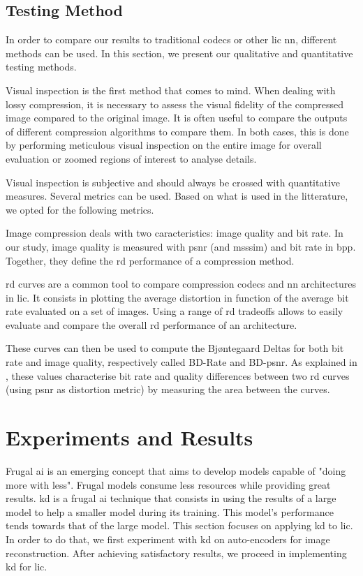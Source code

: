 \documentclass{article}
\begin{document}
\subsection{Testing Method}
In order to compare our results to traditional codecs or other \acrshort{lic} \acrshort{nn}, different methods can be used. In this section, we present our qualitative and quantitative testing methods.

Visual inspection is the first method that comes to mind. When dealing with lossy compression, it is necessary to assess the visual fidelity of the compressed image compared to the original image. It is often useful to compare the outputs of different compression algorithms to compare them. In both cases, this is done by performing meticulous visual inspection on the entire image for overall evaluation or zoomed regions of interest to analyse details.

Visual inspection is subjective and should always be crossed with quantitative measures. Several metrics can be used. Based on what is used in the litterature, we opted for the following metrics.

Image compression deals with two caracteristics: image quality and bit rate. In our study, image quality is measured with \acrfull{psnr} (and \acrfull{msssim}) and bit rate in \acrfull{bpp}. Together, they define the \acrshort{rd} performance of a compression method.

\acrshort{rd} curves are a common tool to compare compression codecs and \acrshort{nn} architectures in \acrshort{lic}. It consists in plotting the average distortion in function of the average bit rate evaluated on a set of images. Using a range of \acrshort{rd} tradeoffs allows to easily evaluate and compare the overall \acrshort{rd} performance of an architecture.

These curves can then be used to compute the Bjøntegaard Deltas for both bit rate and image quality, respectively called BD-Rate and BD-\acrshort{psnr}. As explained in \cite{barman2024bjontegaarddeltabdtutorial}, these values characterise bit rate and quality differences between two \acrshort{rd} curves (using \acrshort{psnr} as distortion metric) by measuring the area between the curves.

\section{Experiments and Results}
\label{experiments_and_results}
Frugal \acrshort{ai} is an emerging concept that aims to develop models capable of "doing more with less". Frugal models consume less resources while providing great results. \acrshort{kd} is a frugal \acrshort{ai} technique that consists in using the results of a large model to help a smaller model during its training. This model's performance tends towards that of the large model. This section focuses on applying \acrshort{kd} to \acrshort{lic}. In order to do that, we first experiment with \acrshort{kd} on auto-encoders for image reconstruction. After achieving satisfactory results, we proceed in implementing \acrshort{kd} for \acrshort{lic}.
\end{document}
